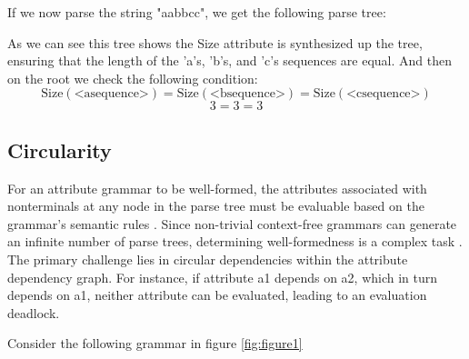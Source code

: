 If we now parse the string "aabbcc", we get the following parse tree:

\vspace{1cm}


\vspace{1cm}

As we can see this tree shows the Size attribute is synthesized up the tree, ensuring that the length of the 'a's, 'b's, and 'c's sequences
are equal. 
And then on the root we check the following condition:
\[
\text{Size}(\text{<asequence>}) = \text{Size}(\text{<bsequence>}) = \text{Size}(\text{<csequence>})
\]
\[
3 = 3 = 3
\]


\subsection{Circularity}

For an attribute grammar to be well-formed, the attributes associated with nonterminals at any node in the parse tree must be evaluable based 
on the grammar's semantic rules \cite{gordon}. Since non-trivial context-free grammars can generate an infinite number of parse trees, determining 
well-formedness is a complex task \cite{cit5}. The primary challenge lies in circular dependencies within the attribute dependency graph. 
For instance, if attribute a1 depends on a2, which in turn depends on a1, neither attribute can be evaluated, leading to an evaluation deadlock.

Consider the following grammar in figure \ref{fig:figure1}

